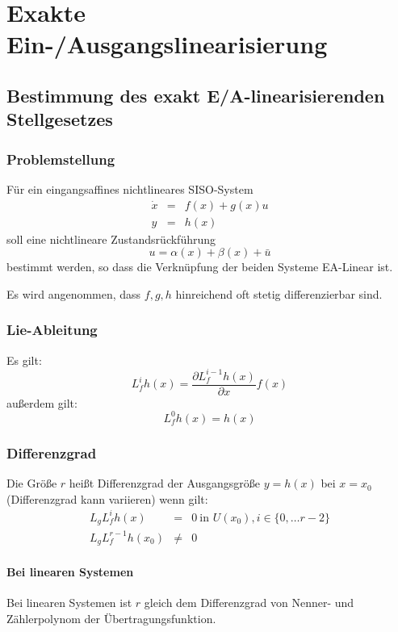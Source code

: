 \chapter{Exakte Ein-/Ausgangslinearisierung}
\section{Bestimmung des exakt E/A-linearisierenden Stellgesetzes}
\subsection{Problemstellung}
Für ein eingangsaffines nichtlineares SISO-System
\begin{eqnarray}
    \dot{x} &=& f(x) + g(x) u \\
    y &=& h(x)
\end{eqnarray}
soll eine nichtlineare Zustandsrückführung
\begin{equation}
    u = \alpha(x) + \beta(x) + \bar{u}
\end{equation} 
bestimmt werden, so dass die Verknüpfung der beiden Systeme EA-Linear ist.

Es wird angenommen, dass $f, g, h$ hinreichend oft stetig differenzierbar sind.

\subsection{Lie-Ableitung}
Es gilt:
\begin{equation}
    L_f^i h(x) = \frac{\partial L_f^{i-1} h(x)}{\partial x} f(x)
\end{equation}
außerdem gilt:
\begin{equation}
    L_f^0 h(x) = h(x)
\end{equation}

\subsection{Differenzgrad}
Die Größe $r$ heißt Differenzgrad der Ausgangsgröße $y=h(x)$ bei $x=x_0$ (Differenzgrad
kann variieren) wenn gilt:
\begin{eqnarray}
    L_g L_f^i h(x) &=& 0\ \text{in } U(x_0), i \in \{0, \ldots r-2\} \\
    L_g L_f^{r-1} h(x_0) &\neq& 0
\end{eqnarray}

\subsubsection{Bei linearen Systemen}
Bei linearen Systemen ist $r$ gleich dem Differenzgrad von Nenner- und Zählerpolynom
der Übertragungsfunktion.

